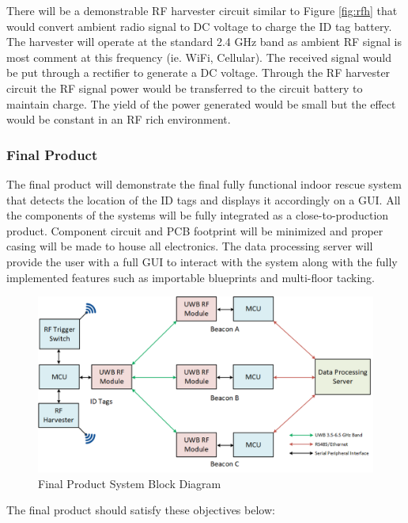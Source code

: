 \bigskip
There will be a demonstrable RF harvester circuit similar to Figure \ref{fig:rfh} that would convert ambient radio signal to DC voltage to charge the ID tag battery. The harvester will operate at the standard 2.4 GHz band as ambient RF signal is most comment at this frequency (ie. WiFi, Cellular). The received signal would be put through a rectifier to generate a DC voltage. Through the RF harvester circuit the RF signal power would be transferred to the circuit battery to maintain charge. The yield of the power generated would be small but the effect would be constant in an RF rich environment.

\break
\subsubsection{Final Product}
\bigskip
The final product will demonstrate the final fully functional indoor rescue system that detects the location of the ID tags and displays it accordingly on a GUI. All the components of the systems will be fully integrated as a close-to-production product. Component circuit and \Gls{PCB} footprint will be minimized and proper casing will be made to house all electronics. The data processing server will provide the user with a full GUI to interact with the system along with the fully implemented features such as importable blueprints and multi-floor tacking.

\begin{figure}[h!]
    \centering
    \includegraphics[width=\linewidth]{./images/03_sys_Final.png}
    \caption{Final Product System Block Diagram}
    \label{final_prod_sys_blk}
\end{figure}
\bigskip

The final product should satisfy these objectives below:

